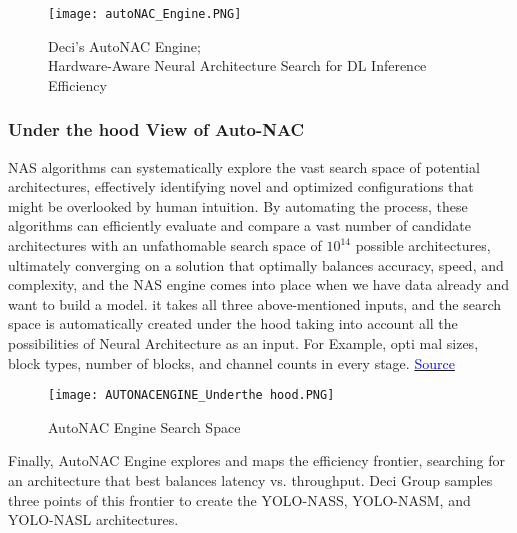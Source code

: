 \begin{figure}[H]
    \centering
    \texttt{[image: autoNAC\_Engine.PNG]}
    \caption{Deci's AutoNAC Engine; \\
    Hardware-Aware Neural Architecture Search for DL Inference Efficiency}
    \label{fig:AutoNAC Engine}
\end{figure}

\subsubsection{Under the hood View of Auto-NAC}
NAS algorithms can systematically explore the vast search space of potential architectures, effectively identifying novel and optimized configurations that might be overlooked by human intuition. By automating the process, these algorithms can efficiently evaluate and compare a vast number of candidate architectures with an unfathomable search space of $10^{14}$ possible architectures, ultimately converging on a solution that optimally balances accuracy, speed, and complexity, and the NAS engine comes into place when we have data already and want to build a model.
it takes all three above-mentioned inputs, and the search space is automatically created under the hood taking into account all the possibilities of Neural Architecture as an input. For Example, opti mal sizes, block types, number of blocks, and channel counts in every stage. \cite{yolo-nas-webinar}  \href{https://deci.ai/blog/sota-dnns-overview/}{\textcolor{blue}{Source}}  
\begin{figure}[H]
    \centering
    \texttt{[image: AUTONACENGINE\_Underthe hood.PNG]}
    \caption{AutoNAC Engine Search Space}
    \label{fig:autonac_under_the_hood}
\end{figure}
Finally, AutoNAC Engine explores and maps the efficiency frontier, searching for an architecture that best balances latency vs. throughput. Deci Group samples three points of this frontier to create the YOLO-NASS, YOLO-NASM, and YOLO-NASL architectures.
